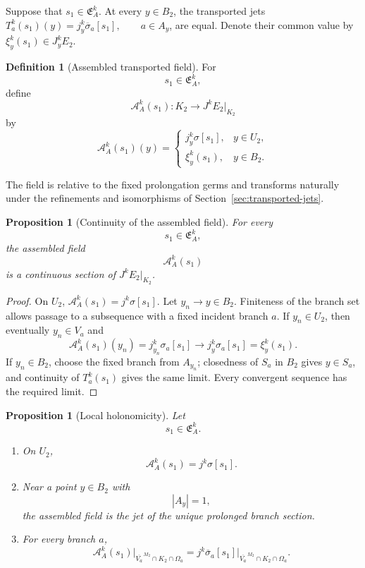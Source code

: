 \documentclass[11pt]{article}
\theoremstyle{plain}
\newtheorem{proposition}[theorem]{Proposition}
\theoremstyle{definition}
\newtheorem{definition}[theorem]{Definition}
\begin{document}
Suppose that
\(s_1\in\mathfrak E_A^k\).
At every \(y\in B_2\), the transported jets
\(T_a^k(s_1)(y) = j_y^k \overline{\sigma}_a[s_1], \qquad a\in A_y\),
are equal. Denote their common value by
\(\xi_y^k(s_1)\in J_y^k E_2\).

\begin{definition}[Assembled transported field]
\label{def:assembled-transported-field}
For
\[
  s_1\in\mathfrak E_A^k,
\]
define
\[
  \mathcal A_A^k(s_1):
  K_2\longrightarrow J^kE_2|_{K_2}
\]
by
\[
  \mathcal A_A^k(s_1)(y)
  =
  \begin{cases}
    j_y^k \sigma[s_1],
    &y\in U_2,\\[1mm]
    \xi_y^k(s_1),
    &y\in B_2.
  \end{cases}
\]
\end{definition}

The field is relative to the fixed prolongation germs and transforms naturally under the refinements and isomorphisms of Section~\ref{sec:transported-jets}.

\begin{proposition}[Continuity of the assembled field]
\label{prop:assembled-field-continuity}
For every
\[
  s_1\in\mathfrak E_A^k,
\]
the assembled field
\[
  \mathcal A_A^k(s_1)
\]
is a continuous section of \(J^kE_2|_{K_2}\).
\end{proposition}

\begin{proof}
On \(U_2\), \(\mathcal A_A^k(s_1)=j^k\sigma[s_1]\). Let \(y_n\to y\in B_2\). Finiteness of the branch set allows passage to a subsequence with a fixed incident branch \(a\). If \(y_n\in U_2\), then eventually \(y_n\in V_a\) and
\[
 \mathcal A_A^k(s_1)(y_n)=j_{y_n}^k\sigma_a[s_1]\to j_y^k\sigma_a[s_1]=\xi_y^k(s_1).
\]
If \(y_n\in B_2\), choose the fixed branch from \(A_{y_n}\); closedness of \(S_a\) in \(B_2\) gives \(y\in S_a\), and continuity of \(T_a^k(s_1)\) gives the same limit. Every convergent sequence has the required limit.
\end{proof}

\begin{proposition}[Local holonomicity]
\label{prop:assembled-local-holonomicity}
Let
\[
  s_1\in\mathfrak E_A^k.
\]

\begin{enumerate}[label=\textup{(\roman*)}]
  \item On \(U_2\),
        \[
          \mathcal A_A^k(s_1)
          =
          j^k \sigma[s_1].
        \]

  \item Near a point \(y\in B_2\) with
        \[
          |A_y|=1,
        \]
        the assembled field is the jet of the unique prolonged branch
        section.

  \item For every branch \(a\),
        \[
          \mathcal A_A^k(s_1)
          \big|
          _{\overline{V_a}^{\,M_2}\cap K_2\cap\Omega_a}
          =
          j^k \overline{\sigma}_a[s_1]
          \big|
          _{\overline{V_a}^{\,M_2}\cap K_2\cap\Omega_a}.
        \]
\end{enumerate}
\end{proposition}
\end{document}
